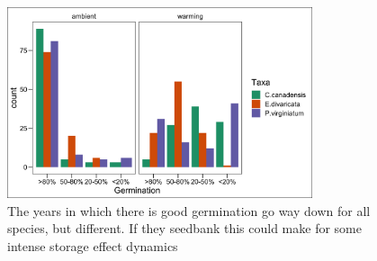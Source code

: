 \documentclass[11pt]{article}
\begin{document}
        \begin{figure}[h!]
        \centering
        \includegraphics[width=0.8\textwidth]{..//figures/germfreq.png}
          \caption{The years in which there is good germination go way down for all species, but different. If they seedbank this could make for some intense storage effect dynamics}
        \label{fig:germfreq}
    \end{figure}

  
\end{document}
